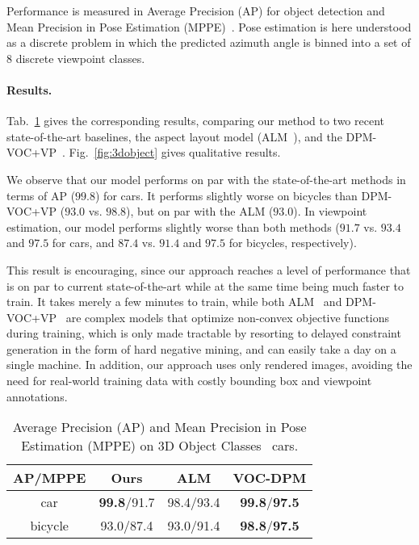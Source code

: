  Performance is measured in Average Precision
(AP) for object detection and Mean Precision in Pose Estimation
(MPPE)~\cite{Lopez-Sastre11}. Pose estimation is here understood as a
discrete problem in which the predicted azimuth angle is binned into a
set of $8$ discrete viewpoint classes.

\paragraph{Results.}
Tab.~\ref{tab:3dobject} gives the corresponding results, comparing our
method to two recent state-of-the-art baselines, the aspect layout
model (ALM~\cite{Xiang12}), and the
DPM-VOC+VP~\cite{Pepik12}. Fig.~\ref{fig:3dobject} gives
qualitative results.

We observe that our model performs on par with the state-of-the-art
methods in terms of AP ($99.8$) for cars. It performs slightly worse
on bicycles than DPM-VOC+VP ($93.0$ vs. $98.8$), but on par with the
ALM ($93.0$). In viewpoint estimation, our model performs slightly
worse than both methods ($91.7$ vs. $93.4$ and $97.5$ for cars, and
$87.4$ vs. $91.4$ and $97.5$ for bicycles, respectively).

This result is encouraging, since our approach reaches a level of
performance that is on par to current state-of-the-art while at the
same time being much faster to train. It takes merely a few minutes to
train, while both ALM~\cite{Xiang12} and DPM-VOC+VP~\cite{Pepik12} are
complex models that optimize non-convex objective functions during
training, which is only made tractable by resorting to delayed
constraint generation in the form of hard negative mining, and can
easily take a day on a single machine. In addition, our approach uses
only rendered images, avoiding the need for real-world training data
with costly bounding box and viewpoint annotations.
%
\begin{table}[!htbp]
    \footnotesize
  \begin{center}
    \begin{tabular}{|c|c|c|c|}
    \hline
     AP/MPPE& Ours & ALM\cite{Xiang12} & VOC-DPM\cite{Pepik12} \\
    \hline\hline
    car & \textbf{99.8}/91.7 &  98.4/93.4 & \textbf{99.8}/\textbf{97.5} \\ 
    bicycle & 93.0/87.4 & 93.0/91.4 & \textbf{98.8}/\textbf{97.5} \\
    \hline
    \end{tabular}
  \end{center}
  \caption{Average Precision (AP) and Mean Precision in Pose
    Estimation (MPPE) on 3D Object Classes~\cite{Savarese07} cars.}%
  \label{tab:3dobject}
\end{table}

